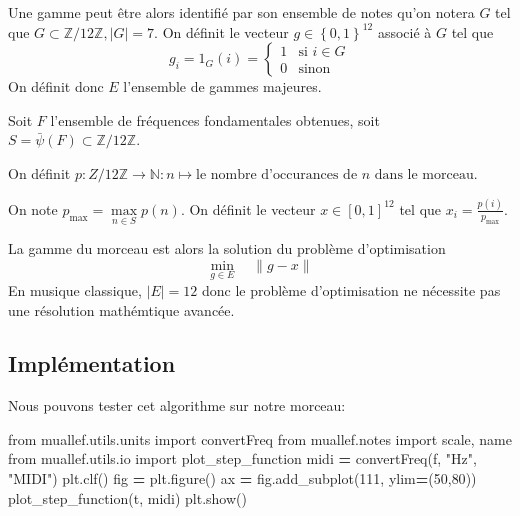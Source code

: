 \documentclass[french,]{article}
\newenvironment{Shaded}{\begin{snugshade}}{\end{snugshade}}
\newcommand{\DecValTok}[1]{\textcolor[rgb]{0.00,0.00,0.81}{#1}}
\newcommand{\ImportTok}[1]{#1}
\newcommand{\NormalTok}[1]{#1}
\newcommand{\OperatorTok}[1]{\textcolor[rgb]{0.81,0.36,0.00}{\textbf{#1}}}
\newcommand{\StringTok}[1]{\textcolor[rgb]{0.31,0.60,0.02}{#1}}
\begin{document}
Une gamme peut être alors identifié par son ensemble de notes qu'on
notera \(G\) tel que \(G\subset\mathbb{Z}/12\mathbb{Z}, |G|=7\). On
définit le vecteur \(g\in\left\{0,1\right\}^{12}\) associé à \(G\) tel
que \[ g_i = 1_G(i) =
\begin{cases} 1 & \text{si } i\in G\\ 0 &\text{sinon}\end{cases}\] On
définit donc \(E\) l'ensemble de gammes majeures.

Soit \(F\) l'ensemble de fréquences fondamentales obtenues, soit
\(S=\bar{\psi}(F)\subset\mathbb{Z}/12\mathbb{Z}\).

On définit
\(p:{Z}/12\mathbb{Z}\rightarrow\mathbb{N}:n\mapsto\text{le nombre d'occurances de $n$ dans le morceau}\).

On note \(p_{\max}=\max\limits_{n\in S} p(n)\). On définit le vecteur
\(x\in\left[0,1\right]^{12}\) tel que \(x_i=\frac{p(i)}{p_{\max}}\).

La gamme du morceau est alors la solution du problème d'optimisation
\[ \min\limits_{g\in E}\quad \lVert g-x \rVert \] En musique classique,
\(\lvert E\rvert = 12\) donc le problème d'optimisation ne nécessite pas
une résolution mathémtique avancée.

\hypertarget{implementation-2}{%
\subsection{Implémentation}\label{implementation-2}}

Nous pouvons tester cet algorithme sur notre morceau:

\begin{Shaded}
\begin{Highlighting}[]
\ImportTok{from}\NormalTok{ muallef.utils.units }\ImportTok{import}\NormalTok{ convertFreq}
\ImportTok{from}\NormalTok{ muallef.notes }\ImportTok{import}\NormalTok{ scale, name}
\ImportTok{from}\NormalTok{ muallef.utils.io }\ImportTok{import}\NormalTok{ plot_step_function}
\NormalTok{midi }\OperatorTok{=}\NormalTok{ convertFreq(f, }\StringTok{"Hz"}\NormalTok{, }\StringTok{"MIDI"}\NormalTok{)}
\NormalTok{plt.clf()}
\NormalTok{fig }\OperatorTok{=}\NormalTok{ plt.figure()}
\NormalTok{ax }\OperatorTok{=}\NormalTok{ fig.add_subplot(}\DecValTok{111}\NormalTok{, ylim}\OperatorTok{=}\NormalTok{(}\DecValTok{50}\NormalTok{,}\DecValTok{80}\NormalTok{))}
\NormalTok{plot_step_function(t, midi)}
\NormalTok{plt.show()}
\end{Highlighting}
\end{Shaded}
\end{document}
